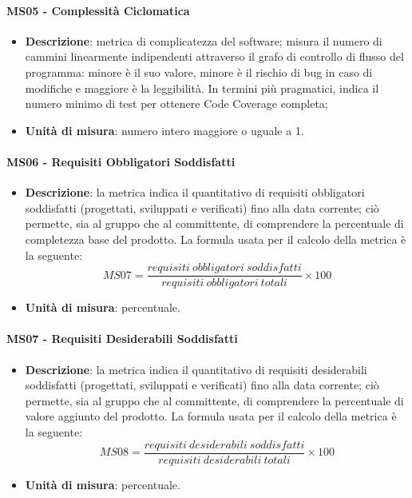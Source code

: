         \paragraph{MS05 - Complessità Ciclomatica}
        \begin{itemize}
            \item \textbf{Descrizione}: metrica di complicatezza del software; misura il numero di cammini linearmente indipendenti attraverso il grafo di controllo di flusso del programma: minore è il suo valore, minore è il rischio di bug in caso di modifiche e maggiore è la leggibilità. In termini più pragmatici, indica il numero minimo di test per ottenere Code Coverage completa;
            \item \textbf{Unità di misura}: numero intero maggiore o uguale a 1.
        \end{itemize}

		\paragraph{MS06 - Requisiti Obbligatori Soddisfatti}
		\begin{itemize}
			\item \textbf{Descrizione}: la metrica indica il quantitativo di requisiti obbligatori soddisfatti (progettati, sviluppati e verificati) fino alla data corrente; ciò permette, sia al gruppo che al committente, di comprendere la percentuale di completezza base del prodotto. La formula usata per il calcolo della metrica è la seguente:
            \[
            MS07 = \frac{requisiti\ obbligatori\ soddisfatti}{requisiti\ obbligatori\ totali} \times 100
            \]
			\item \textbf{Unità di misura}: percentuale.
		\end{itemize}

		\paragraph{MS07 - Requisiti Desiderabili Soddisfatti}
		\begin{itemize}
			\item \textbf{Descrizione}: la metrica indica il quantitativo di requisiti desiderabili soddisfatti (progettati, sviluppati e verificati) fino alla data corrente; ciò permette, sia al gruppo che al committente, di comprendere la percentuale di valore aggiunto del prodotto. La formula usata per il calcolo della metrica è la seguente:
            \[
            MS08 = \frac{requisiti\ desiderabili\ soddisfatti}{requisiti\ desiderabili\ totali} \times 100
            \]
			\item \textbf{Unità di misura}: percentuale.
		\end{itemize}


